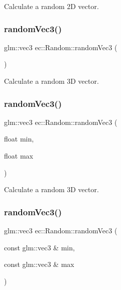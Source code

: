 Calculate a random 2D vector. \mbox{\label{classec_1_1_random_a4242b9cac76d3e88bde39826ddbd6e3c}} 
\subsubsection{\texorpdfstring{random\+Vec3()}{randomVec3()}\hspace{0.1cm}{\footnotesize\ttfamily [1/3]}}
{\footnotesize\ttfamily glm\+::vec3 ec\+::\+Random\+::random\+Vec3 (\begin{DoxyParamCaption}{ }\end{DoxyParamCaption})\hspace{0.3cm}{\ttfamily [static]}}

Calculate a random 3D vector. \mbox{\label{classec_1_1_random_a84ec2078788971de906b5f2f17a61d55}} 
\subsubsection{\texorpdfstring{random\+Vec3()}{randomVec3()}\hspace{0.1cm}{\footnotesize\ttfamily [2/3]}}
{\footnotesize\ttfamily glm\+::vec3 ec\+::\+Random\+::random\+Vec3 (\begin{DoxyParamCaption}\item[{float}]{min,  }\item[{float}]{max }\end{DoxyParamCaption})\hspace{0.3cm}{\ttfamily [static]}}

Calculate a random 3D vector. \mbox{\label{classec_1_1_random_ae3f46b4ffbbceb18e0b9c3a2b4780710}} 
\subsubsection{\texorpdfstring{random\+Vec3()}{randomVec3()}\hspace{0.1cm}{\footnotesize\ttfamily [3/3]}}
{\footnotesize\ttfamily glm\+::vec3 ec\+::\+Random\+::random\+Vec3 (\begin{DoxyParamCaption}\item[{const glm\+::vec3 \&}]{min,  }\item[{const glm\+::vec3 \&}]{max }\end{DoxyParamCaption})\hspace{0.3cm}{\ttfamily [static]}}

